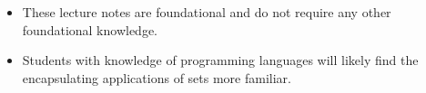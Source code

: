 \begin{itemize}
  \item These lecture notes are foundational and do not require any other foundational knowledge.
  \item Students with knowledge of programming languages will likely find the encapsulating applications of sets more familiar.
\end{itemize}